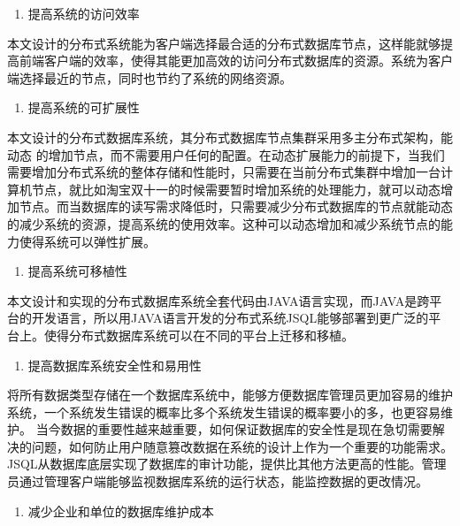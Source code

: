	\begin{enumerate}[resume]
		\item 提高系统的访问效率
	\end{enumerate}

	本文设计的分布式系统能为客户端选择最合适的分布式数据库节点，这样能就够提高前端客户端的效率，使得其能更加高效的访问分布式数据库的资源。系统为客户端选择最近的节点，同时也节约了系统的网络资源。
	
	\begin{enumerate}[resume]
		\item 提高系统的可扩展性
	\end{enumerate}

	本文设计的分布式数据库系统，其分布式数据库节点集群采用多主分布式架构，能动态
	的增加节点，而不需要用户任何的配置。在动态扩展能力的前提下，当我们需要增加分布式系统的整体存储和性能时，只需要在当前分布式集群中增加一台计算机节点，就比如淘宝双十一的时候需要暂时增加系统的处理能力，就可以动态增加节点。而当数据库的读写需求降低时，只需要减少分布式数据库的节点就能动态的减少系统的资源，提高系统的使用效率。这种可以动态增加和减少系统节点的能力使得系统可以弹性扩展。
	
	\begin{enumerate}[resume]
		\item 提高系统可移植性
	\end{enumerate}

	本文设计和实现的分布式数据库系统全套代码由JAVA语言实现，而JAVA是跨平台的开发语言，所以用JAVA语言开发的分布式系统JSQL能够部署到更广泛的平台上。使得分布式数据库系统可以在不同的平台上迁移和移植。
	
	\begin{enumerate}[resume]
		\item 提高数据库系统安全性和易用性
	\end{enumerate}

将所有数据类型存储在一个数据库系统中，能够方便数据库管理员更加容易的维护系统，一个系统发生错误的概率比多个系统发生错误的概率要小的多，也更容易维护。
	当今数据的重要性越来越重要，如何保证数据库的安全性是现在急切需要解决的问题，如何防止用户随意篡改数据在系统的设计上作为一个重要的功能需求。JSQL从数据库底层实现了数据库的审计功能，提供比其他方法更高的性能。管理员通过管理客户端能够监视数据库系统的运行状态，能监控数据的更改情况。
	
		\begin{enumerate}[resume]
		\item 减少企业和单位的数据库维护成本
	\end{enumerate}
	
